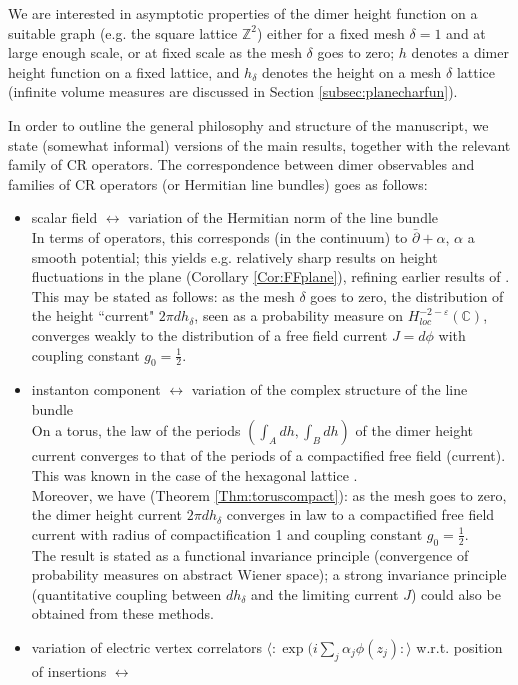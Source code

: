 \documentclass[10pt]{article}
\newcommand{\Z}{\mathbb{Z}}
\newcommand{\C}{\mathbb{C}}
\newcommand{\eps}{\varepsilon}
\newcommand{\dbar}{\bar\partial}
\begin{document}
We are interested in asymptotic properties of the dimer height function on a suitable graph (e.g. the square lattice $\Z^2$) either for a fixed mesh $\delta=1$ and at large enough scale, or at fixed scale as the mesh $\delta$ goes to zero; $h$ denotes a dimer height function on a fixed lattice, and $h_\delta$ denotes the height on a mesh $\delta$ lattice (infinite volume measures are discussed in Section \ref{subsec:planecharfun}).

In order to outline the general philosophy and structure of the manuscript, we state (somewhat informal) versions of the main results, together with the relevant family of CR operators. The correspondence between dimer observables and families of CR operators (or Hermitian line bundles) goes as follows:
\begin{itemize}
\item scalar field $\leftrightarrow$ variation of the Hermitian norm of the line bundle\\
In terms of operators, this corresponds (in the continuum) to $\dbar+\alpha$, $\alpha$ a smooth potential; this yields e.g. relatively sharp results on height fluctuations in the plane (Corollary \ref{Cor:FFplane}), refining earlier results of \cite{Ken_domino_GFF,dT_isoradial}. This may be stated as follows: as the mesh $\delta$ goes to zero, the distribution of the height ``current" $2\pi dh_\delta$, seen as a probability measure on $H^{-2-\eps}_{loc}(\C)$, converges weakly to the distribution of a free field current $J=d\phi$ with coupling constant $g_0=\frac 12$.
\item instanton component $\leftrightarrow$ variation of the complex structure of the line bundle\\
On a torus, the law of the periods $(\int_A dh,\int_B dh)$ of the dimer height current converges to that of the periods of a compactified free field (current). This was known in the case of the hexagonal lattice \cite{BdT_loop}.\\
Moreover, we have (Theorem \ref{Thm:toruscompact}): as the mesh goes to zero, the dimer height current $2\pi dh_\delta$ converges in law to a compactified free field current with radius of compactification 1 and coupling constant $g_0=\frac 12$.\\
The result is stated as a functional invariance principle (convergence of probability measures on abstract Wiener space); a strong invariance principle (quantitative coupling between $dh_\delta$ and the limiting current $J$) could also be obtained from these methods.
\item variation of electric vertex correlators $\langle:\exp(i\sum_j\alpha_j\phi(z_j):\rangle$ w.r.t. position of insertions $\leftrightarrow$ 

\end{itemize}
\end{document}
